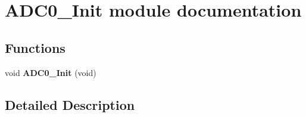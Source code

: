 \hypertarget{group___a_d_c0___init__module}{}\section{A\+D\+C0\+\_\+\+Init module documentation}
\label{group___a_d_c0___init__module}
\subsection*{Functions}
\begin{DoxyCompactItemize}
\item 
void {\bfseries A\+D\+C0\+\_\+\+Init} (void)\hypertarget{group___a_d_c0___init__module_ga690f4c62cab35ab8f427e688d96a610e}{}\label{group___a_d_c0___init__module_ga690f4c62cab35ab8f427e688d96a610e}

\end{DoxyCompactItemize}


\subsection{Detailed Description}
